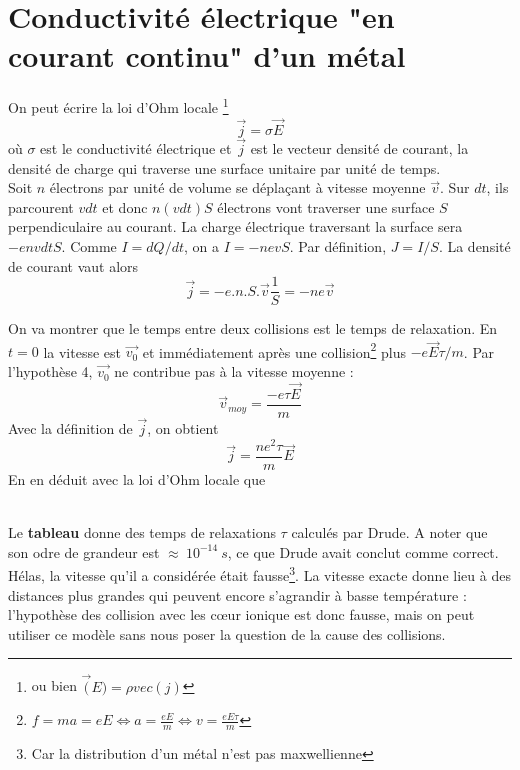 \section{Conductivité électrique "en courant continu" d'un métal}
On peut écrire la loi d'Ohm locale \footnote{ou bien $\vec(E) = \rho vec(j)$} 
\begin{equation}
\vec{j} = \sigma\vec{E}
\end{equation}
où $\sigma$ est le conductivité électrique et $\vec{j}$ est le vecteur densité de 
courant, la densité de charge qui traverse une surface unitaire par unité de temps.\\

Soit $n$ électrons par unité de volume se déplaçant à vitesse moyenne $\vec{v}$. Sur 
$dt$, ils parcourent $vdt$ et donc $n(vdt)S$ électrons vont traverser une surface $S$ 
perpendiculaire au courant. La charge électrique traversant la surface sera $-envdtS$.
Comme $I = dQ/dt$, on a $I = -nevS$. Par définition, $J = I/S$. La densité de courant 
vaut alors
\begin{equation}
\vec j = -e.n.S.\vec v\frac{1}{S} = -ne\vec{v}
\end{equation}

On va montrer que le temps entre deux collisions est le temps de relaxation. En $t=0$ 
la vitesse est $\vec{v_0}$ et immédiatement après une collision\footnote{$f = ma = eE 
\Leftrightarrow a = \frac{eE}{m} \Leftrightarrow v = \frac{eE\tau }{m}$} plus $-e\vec{E}
\tau/m$. Par l'hypothèse 4, $\vec{v_0}$ ne contribue pas à la vitesse moyenne :
\begin{equation}
\vec{v}_{moy} = \dfrac{-e\tau\vec E}{m}
\end{equation}
Avec la définition de $\vec j$, on obtient
\begin{equation}
\vec j = \dfrac{ne^2\tau}{m}\vec{E}
\end{equation}
En en déduit avec la loi d'Ohm locale que\\
\

\newpage\noindent
Le \textbf{tableau} donne des temps de relaxations $\tau$ calculés par Drude. A noter 
que son odre de grandeur est $\approx\ 10^{-14}\ s$, ce que Drude avait conclut comme 
correct.  Hélas, la vitesse qu'il a considérée était fausse\footnote{Car la distribution 
d'un métal n'est pas maxwellienne}. La vitesse exacte donne lieu à des distances 
plus grandes qui peuvent encore s’agrandir à basse température : l’hypothèse des 
collision avec les cœur ionique est donc fausse, mais on peut utiliser ce modèle sans 
nous poser la question de la cause des collisions.

